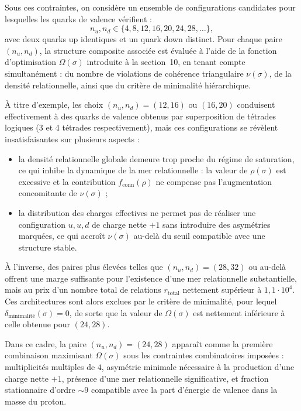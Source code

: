 \documentclass[11pt,a4paper]{article}
\begin{document}
Sous ces contraintes, on considère un ensemble de configurations candidates pour lesquelles les quarks de valence vérifient :
\[
n_u, n_d \in \{4,8,12,16,20,24,28,\ldots\},
\]
avec deux quarks up identiques et un quark down distinct. Pour chaque paire \(\left(n_u,n_d\right)\), la structure composite associée est évaluée à l’aide de la fonction d’optimisation \(\Omega\left(\sigma\right)\) introduite à la section~10, en tenant compte simultanément : du nombre de violations de cohérence triangulaire \(\nu\left(\sigma\right)\), de la densité relationnelle, ainsi que du critère de minimalité hiérarchique.

À titre d’exemple, les choix \(\left(n_u,n_d\right)=\left(12,16\right)\) ou \(\left(16,20\right)\) conduisent effectivement à des quarks de valence obtenus par superposition de tétrades logiques (3 et 4 tétrades respectivement), mais ces configurations se révèlent insatisfaisantes sur plusieurs aspects :
\begin{itemize}
  \item la densité relationnelle globale demeure trop proche du régime de saturation, ce qui inhibe la dynamique de la mer relationnelle : la valeur de \(\rho\left(\sigma\right)\) est excessive et la contribution \(f_{\mathrm{conn}}\left(\rho\right)\) ne compense pas l’augmentation concomitante de \(\nu\left(\sigma\right)\) ;
  \item la distribution des charges effectives ne permet pas de réaliser une configuration \(u,u,d\) de charge nette \(+1\) sans introduire des asymétries marquées, ce qui accroît \(\nu\left(\sigma\right)\) au-delà du seuil compatible avec une structure stable.
\end{itemize}

À l’inverse, des paires plus élevées telles que \(\left(n_u,n_d\right)=\left(28,32\right)\) ou au-delà offrent une marge suffisante pour l’existence d’une mer relationnelle substantielle, mais au prix d’un nombre total de relations \(r_{\mathrm{total}}\) nettement supérieur à \(1{,}1\cdot 10^{4}\). Ces architectures sont alors exclues par le critère de minimalité, pour lequel \(\delta_{\text{minimalité}}\!\left(\sigma\right)=0\), de sorte que la valeur de \(\Omega\left(\sigma\right)\) est nettement inférieure à celle obtenue pour \(\left(24,28\right)\).

Dans ce cadre, la paire \(\left(n_u,n_d\right)=\left(24,28\right)\) apparaît comme la première combinaison maximisant \(\Omega\left(\sigma\right)\) sous les contraintes combinatoires imposées : multiplicités multiples de \(4\), asymétrie minimale nécessaire à la production d’une charge nette \(+1\), présence d’une mer relationnelle significative, et fraction stationnaire d’ordre \(\sim 9\) compatible avec la part d’énergie de valence dans la masse du proton.
\end{document}
